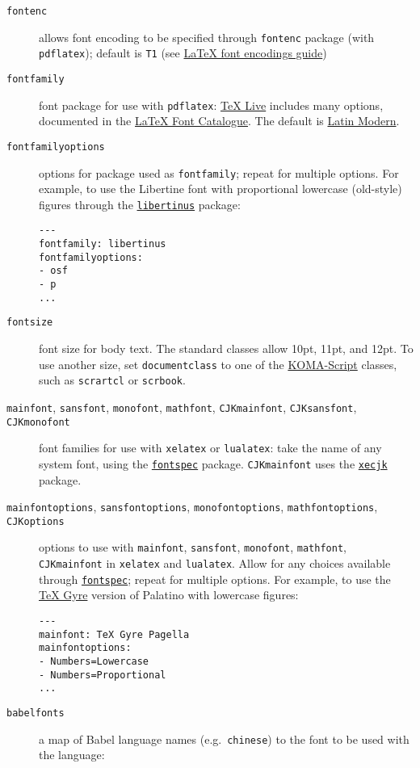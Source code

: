 \documentclass[
  a4paper,
]{article}
\begin{document}
\begin{description}
\item[\texttt{fontenc}]
allows font encoding to be specified through \texttt{fontenc} package
(with \texttt{pdflatex}); default is \texttt{T1} (see
\href{https://ctan.org/pkg/encguide}{LaTeX font encodings guide})
\item[\texttt{fontfamily}]
font package for use with \texttt{pdflatex}:
\href{https://www.tug.org/texlive/}{TeX Live} includes many options,
documented in the \href{https://tug.org/FontCatalogue/}{LaTeX Font
Catalogue}. The default is \href{https://ctan.org/pkg/lm}{Latin Modern}.
\item[\texttt{fontfamilyoptions}]
options for package used as \texttt{fontfamily}; repeat for multiple
options. For example, to use the Libertine font with proportional
lowercase (old-style) figures through the
\href{https://ctan.org/pkg/libertinus}{\texttt{libertinus}} package:

\begin{verbatim}
---
fontfamily: libertinus
fontfamilyoptions:
- osf
- p
...
\end{verbatim}
\item[\texttt{fontsize}]
font size for body text. The standard classes allow 10pt, 11pt, and
12pt. To use another size, set \texttt{documentclass} to one of the
\href{https://ctan.org/pkg/koma-script}{KOMA-Script} classes, such as
\texttt{scrartcl} or \texttt{scrbook}.
\item[\texttt{mainfont}, \texttt{sansfont}, \texttt{monofont},
\texttt{mathfont}, \texttt{CJKmainfont}, \texttt{CJKsansfont},
\texttt{CJKmonofont}]
font families for use with \texttt{xelatex} or \texttt{lualatex}: take
the name of any system font, using the
\href{https://ctan.org/pkg/fontspec}{\texttt{fontspec}} package.
\texttt{CJKmainfont} uses the
\href{https://ctan.org/pkg/xecjk}{\texttt{xecjk}} package.
\item[\texttt{mainfontoptions}, \texttt{sansfontoptions},
\texttt{monofontoptions}, \texttt{mathfontoptions}, \texttt{CJKoptions}]
options to use with \texttt{mainfont}, \texttt{sansfont},
\texttt{monofont}, \texttt{mathfont}, \texttt{CJKmainfont} in
\texttt{xelatex} and \texttt{lualatex}. Allow for any choices available
through \href{https://ctan.org/pkg/fontspec}{\texttt{fontspec}}; repeat
for multiple options. For example, to use the
\href{http://www.gust.org.pl/projects/e-foundry/tex-gyre}{TeX Gyre}
version of Palatino with lowercase figures:

\begin{verbatim}
---
mainfont: TeX Gyre Pagella
mainfontoptions:
- Numbers=Lowercase
- Numbers=Proportional
...
\end{verbatim}
\item[\texttt{babelfonts}]
a map of Babel language names (e.g.~\texttt{chinese}) to the font to be
used with the language:


\end{description}
\end{document}
